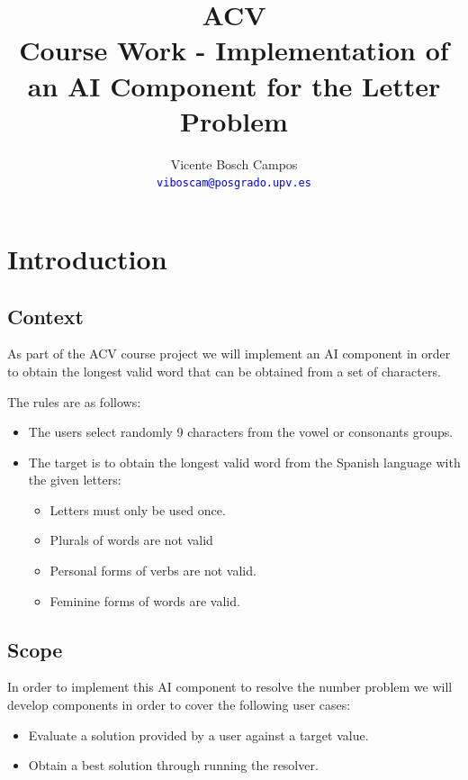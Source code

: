 \documentclass[a4paper,10pt,titlepage]{article}
\title{ACV \\ Course Work - Implementation of an AI Component for the Letter Problem}
\author{Vicente Bosch Campos \dag \\
\textcolor{blue}{\texttt{viboscam@posgrado.upv.es}}}
\begin{document}
\ifpdf
{}
\else
{}
\fi

\maketitle

\tableofcontents

\listoffigures

\newpage

\section{Introduction}
\subsection{Context}

\par As part of the ACV course project we will implement an AI component in order to obtain the longest valid word that can be obtained from a set of characters. 

\par The rules are as follows:
\begin{itemize}
	\item The users select randomly 9 characters from the vowel or consonants groups.
	\item The target is to obtain the longest valid word from the Spanish language with the given letters:
	\begin{itemize}
		\item Letters must only be used once.
		\item Plurals of words are not valid
		\item Personal forms of verbs are not valid.
		\item Feminine forms of words are valid.
	\end{itemize}
\end{itemize}

\subsection{Scope}

\par In order to implement this AI component to resolve the number problem we will develop components in order to cover the following user cases:

\begin{itemize}
	\item Evaluate a solution provided by a user against a target value.
	\item Obtain a best solution through running the resolver. 
\end{itemize}
\end{document}
